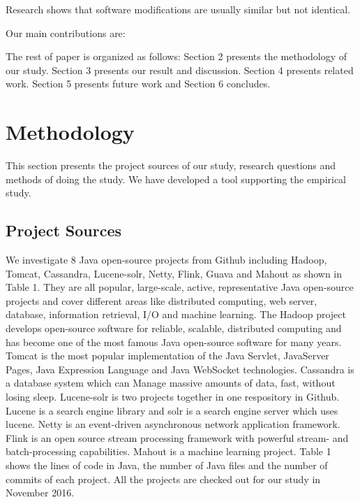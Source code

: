 \documentclass{sig-alternate-05-2015}
\begin{document}
Research shows that software modifications are usually similar but not identical.


Our main contributions are:

The rest of paper is organized as follows: Section 2 presents the methodology of our study. Section 3 presents our result and discussion. Section 4 presents related work. Section 5 presents future work and Section 6 concludes.

\section{Methodology}
This section presents the project sources of our study, research questions and methods of doing the study. We have  developed a tool supporting the empirical study.

\subsection{Project Sources} We investigate 8 Java open-source projects from Github including Hadoop, Tomcat, Cassandra, Lucene-solr, Netty, Flink, Guava and Mahout as shown in Table 1. They are all popular, large-scale, active, representative Java open-source projects and cover different areas like distributed computing, web server, database, information retrieval, I/O and machine learning. The Hadoop project develops open-source software for reliable, scalable, distributed computing and has become one of the most famous Java open-source software for many years. Tomcat is the most popular implementation of the Java Servlet, JavaServer Pages, Java Expression Language and Java WebSocket technologies. Cassandra is a database system which can Manage massive amounts of data, fast, without losing sleep. Lucene-solr is two projects together in one respository in Github. Lucene is a search engine library and solr is a search engine server which uses lucene. Netty is an event-driven asynchronous network application framework. Flink is an open source stream processing framework with powerful stream- and batch-processing capabilities. Mahout is a machine learning project. Table 1 shows the lines of code in Java, the number of Java files and the number of commits of each project. All the projects are checked out for our study in November 2016.
\end{document}

